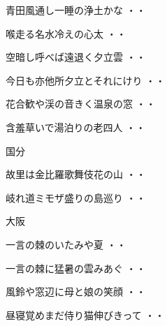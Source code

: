 \begin{shiika}青田風通し一睡の浄土かな
\hfill{・・}\end{shiika}
\begin{shiika}喉走る名水冷えの心太
\hfill{・・}\end{shiika}
\begin{shiika}空暗し呼べば遠退く夕立雲
\hfill{・・}\end{shiika}
\vspace{0.6cm}
\begin{shiika}今日も亦他所夕立とそれにけり
\hfill{・・}\end{shiika}
\vspace{0.6cm}
\begin{shiika}花合歓や渓の音きく温泉の窓
\hfill{・・}\end{shiika}
\vspace{0.6cm}
\begin{shiika}含羞草いで湯泊りの老四人
\hfill{・・}\end{shiika}
\vspace{0.6cm}
国分
\begin{shiika}故里は金比羅歌舞伎花の山
\hfill{・・}\end{shiika}
\vspace{0.6cm}
\begin{shiika}岐れ道ミモザ盛りの島巡り
\hfill{・・}\end{shiika}
\vspace{0.6cm}
大阪
\begin{shiika}一言の棘のいたみや夏
\hfill{・・}\end{shiika}
\vspace{0.6cm}
\begin{shiika}一言の棘に猛暑の雲みあぐ
\hfill{・・}\end{shiika}
\vspace{0.6cm}
\begin{shiika}風鈴や窓辺に母と娘の笑顔
\hfill{・・}\end{shiika}
\vspace{0.6cm}
\begin{shiika}昼寝覚めまだ侍り猫伸びきって
\hfill{・・}\end{shiika}
